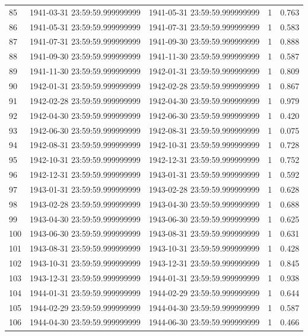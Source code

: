 \begin{table}
\begin{tabular}{lcccc}
85 & 1941-03-31 23:59:59.999999999 & 1941-05-31 23:59:59.999999999 & 1 & 0.763 \\
86 & 1941-05-31 23:59:59.999999999 & 1941-07-31 23:59:59.999999999 & 1 & 0.583 \\
87 & 1941-07-31 23:59:59.999999999 & 1941-09-30 23:59:59.999999999 & 1 & 0.888 \\
88 & 1941-09-30 23:59:59.999999999 & 1941-11-30 23:59:59.999999999 & 1 & 0.587 \\
89 & 1941-11-30 23:59:59.999999999 & 1942-01-31 23:59:59.999999999 & 1 & 0.809 \\
90 & 1942-01-31 23:59:59.999999999 & 1942-02-28 23:59:59.999999999 & 1 & 0.867 \\
91 & 1942-02-28 23:59:59.999999999 & 1942-04-30 23:59:59.999999999 & 1 & 0.979 \\
92 & 1942-04-30 23:59:59.999999999 & 1942-06-30 23:59:59.999999999 & 1 & 0.420 \\
93 & 1942-06-30 23:59:59.999999999 & 1942-08-31 23:59:59.999999999 & 1 & 0.075 \\
94 & 1942-08-31 23:59:59.999999999 & 1942-10-31 23:59:59.999999999 & 1 & 0.728 \\
95 & 1942-10-31 23:59:59.999999999 & 1942-12-31 23:59:59.999999999 & 1 & 0.752 \\
96 & 1942-12-31 23:59:59.999999999 & 1943-01-31 23:59:59.999999999 & 1 & 0.592 \\
97 & 1943-01-31 23:59:59.999999999 & 1943-02-28 23:59:59.999999999 & 1 & 0.628 \\
98 & 1943-02-28 23:59:59.999999999 & 1943-04-30 23:59:59.999999999 & 1 & 0.688 \\
99 & 1943-04-30 23:59:59.999999999 & 1943-06-30 23:59:59.999999999 & 1 & 0.625 \\
100 & 1943-06-30 23:59:59.999999999 & 1943-08-31 23:59:59.999999999 & 1 & 0.631 \\
101 & 1943-08-31 23:59:59.999999999 & 1943-10-31 23:59:59.999999999 & 1 & 0.428 \\
102 & 1943-10-31 23:59:59.999999999 & 1943-12-31 23:59:59.999999999 & 1 & 0.845 \\
103 & 1943-12-31 23:59:59.999999999 & 1944-01-31 23:59:59.999999999 & 1 & 0.938 \\
104 & 1944-01-31 23:59:59.999999999 & 1944-02-29 23:59:59.999999999 & 1 & 0.644 \\
105 & 1944-02-29 23:59:59.999999999 & 1944-04-30 23:59:59.999999999 & 1 & 0.587 \\
106 & 1944-04-30 23:59:59.999999999 & 1944-06-30 23:59:59.999999999 & 1 & 0.466 \\

\end{tabular}
\end{table}
